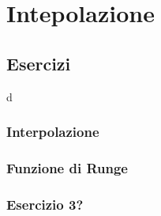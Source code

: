 \setchapterpreamble[u]{\margintoc}
\chapter{Intepolazione}

\section{Esercizi}

d

\subsection{Interpolazione}

\subsection{Funzione di Runge}

\subsection{Esercizio 3?}
